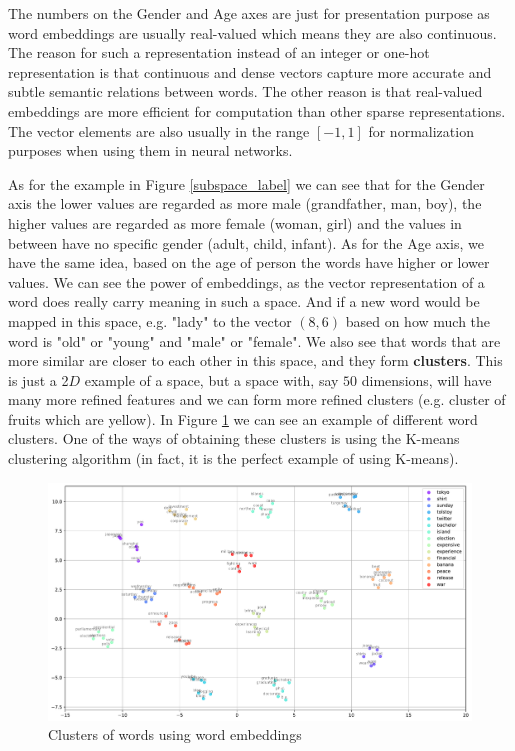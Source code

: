 \documentclass[12pt]{article}
\numberwithin{equation}{section}
\begin{document}
\begin{spacing}{1.5}
	The numbers on the Gender and Age axes are just for presentation purpose as word embeddings are usually real-valued which means they are also continuous. The reason for such a representation instead of an integer or one-hot representation is that continuous and dense vectors capture more accurate and subtle semantic relations between words. The other reason is that real-valued embeddings are more efficient for computation than other sparse representations. The vector elements are also usually in the range $[-1, 1]$ for normalization purposes when using them in neural networks. 
	
	As for the example in Figure \ref{subspace_label} we can see that for the Gender axis the lower values are regarded as more male (grandfather, man, boy), the higher values are regarded as more female (woman, girl) and the values in between have no specific gender (adult, child, infant). As for the Age axis, we have the same idea, based on the age of person the words have higher or lower values. We can see the power of embeddings, as the vector representation of a word does really carry meaning in such a space. And if a new word would be mapped in this space, e.g. "lady" to the vector $(8, 6)$ based on how much the word is "old" or "young" and "male" or "female". We also see that words that are more similar are closer to each other in this space, and they form \textbf{clusters}. This is just a 2$D$ example of a space, but a space with, say $50$ dimensions, will have many more refined features and we can form more refined clusters (e.g. cluster of fruits which are yellow). In Figure \ref{cluster} we can see an example of different word clusters. One of the ways of obtaining these clusters is using the K-means clustering algorithm (in fact, it is the perfect example of using K-means). 
	\begin{figure}[H]
		\centering

		\includegraphics[scale=0.50]{clusters}		
		\caption{Clusters of words using word embeddings}
		\label{cluster}
	\end{figure}
	

\end{spacing}
\end{document}
